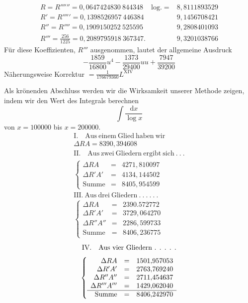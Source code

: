 \[
\begin{array}{lll}
R=R''''''=0{,}0647424830\ 844348&\mathrm{log.}=&8{,}8111893529\\
R'=R'''''=0{,}1398526957\ 446384&&9{,}1456708421\\
R''=R''''=0{,}1909150252\ 525595&&9{,}2808401093\\
R'''=\frac{256}{1225}=0{,}2089795918\ 367347.&&9{,}3201038766
\end{array}
\]
\noindent Für diese Koeffizienten, \(R'''\) ausgenommen, lautet der allgemeine Ausdruck
\[
-\frac{1859}{16800}u^4-\frac{1373}{29400}uu+\frac{7947}{39200}
\]
\noindent Näherungsweise Korrektur \(=\frac{1}{176679360}L^{\mathrm{XIV}}\)

Als krönenden Abschluss werden wir die Wirksamkeit unserer Methode zeigen, indem wir den Wert des Integrals berechnen
\[
\int\frac{\mathrm{d}x}{\log x}
\]
von \(x=100000\) bis \(x=200000\).
\[
\begin{array}{l}
\mathrm{I.\quad Aus\ einem\ Glied\ haben\ wir}\\[3pt]\Delta RA=8390{,}394608\\[6pt]
\mathrm{II.\quad Aus\ zwei\ Gliedern\ ergibt\ sich}\ .\ .\ .\\[3pt]
\left\{\begin{array}{rcl}
\Delta RA&=&4271{,}810097\\
\Delta R'A'&=&4134{,}144502\\\hline
\mathrm{Summe}&=&8405{,}954599
\end{array}\right.\\[8pt]
\mathrm{III.\ Aus\ drei\ Gliedern}\ .\ .\ .\ .\ .\ .\\[3pt]
\left\{\begin{array}{rcl}
\Delta RA&=&2390.572772\\
\Delta R'A'&=&3729{,}064270\\
\Delta R''A''&=&2286{,}599733\\\hline
\mathrm{Summe}&=&8406{,}236775
\end{array}\right.
\end{array}
\]
\endgroup
{}
\[
\begin{gathered}\mbox{IV.\quad Aus vier Gliedern . . . . .}\\[3pt]
\left\{\begin{array}{rcl}
\Delta RA&=&1501{,}957053\\
\Delta R'A'&=&2763{,}769240\\
\Delta R''A''&=&2711{,}454637\\
\Delta R'''A'''&=&1429{,}062040\\ \hline
\mbox{Summe}&=&8406{,}242970
\end{array}\right.\end{gathered}
\]
